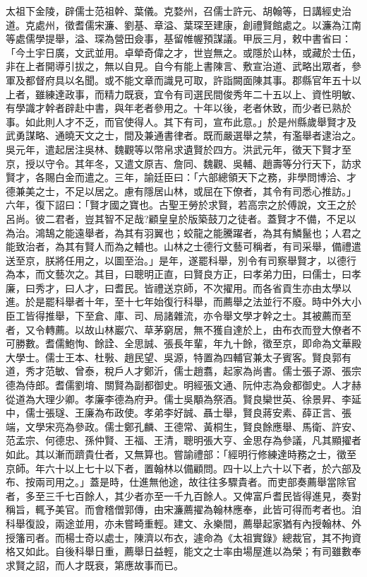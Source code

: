 太祖下金陵，辟儒士范祖幹、葉儀。克婺州，召儒士許元、胡翰等，日講經史治道。克處州，徵耆儒宋濂、劉基、章溢、葉琛至建康，創禮賢館處之。以濂為江南等處儒學提舉，溢、琛為營田僉事，基留帷幄預謀議。甲辰三月，敕中書省曰：「今土宇日廣，文武並用。卓犖奇偉之才，世豈無之。或隱於山林，或藏於士伍，非在上者開導引拔之，無以自見。自今有能上書陳言、敷宣治道、武略出眾者，參軍及都督府具以名聞。或不能文章而識見可取，許詣闕面陳其事。郡縣官年五十以上者，雖練達政事，而精力既衰，宜令有司選民間俊秀年二十五以上、資性明敏、有學識才幹者辟赴中書，與年老者參用之。十年以後，老者休致，而少者已熟於事。如此則人才不乏，而官使得人。其下有司，宣布此意。」於是州縣歲舉賢才及武勇謀略、通曉天文之士，間及兼通書律者。既而嚴選舉之禁，有濫舉者逮治之。吳元年，遣起居注吳林、魏觀等以幣帛求遺賢於四方。洪武元年，徵天下賢才至京，授以守令。其年冬，又遣文原吉、詹同、魏觀、吳輔、趙壽等分行天下，訪求賢才，各賜白金而遣之。三年，諭廷臣曰：「六部總領天下之務，非學問博洽、才德兼美之士，不足以居之。慮有隱居山林，或屈在下僚者，其令有司悉心推訪。」六年，復下詔曰：「賢才國之寶也。古聖王勞於求賢，若高宗之於傅說，文王之於呂尚。彼二君者，豈其智不足哉?顧皇皇於版築鼓刀之徒者。蓋賢才不備，不足以為治。鴻鵠之能遠舉者，為其有羽翼也；蛟龍之能騰躍者，為其有鱗鬣也；人君之能致治者，為其有賢人而為之輔也。山林之士德行文藝可稱者，有司采舉，備禮遣送至京，朕將任用之，以圖至治。」是年，遂罷科舉，別令有司察舉賢才，以德行為本，而文藝次之。其目，曰聰明正直，曰賢良方正，曰孝弟力田，曰儒士，曰孝廉，曰秀才，曰人才，曰耆民。皆禮送京師，不次擢用。而各省貢生亦由太學以進。於是罷科舉者十年，至十七年始復行科舉，而薦舉之法並行不廢。時中外大小臣工皆得推舉，下至倉、庫、司、局諸雜流，亦令舉文學才幹之士。其被薦而至者，又令轉薦。以故山林巖穴、草茅窮居，無不獲自達於上，由布衣而登大僚者不可勝數。耆儒鮑恂、餘詮、全思誠、張長年輩，年九十餘，徵至京，即命為文華殿大學士。儒士王本、杜斅、趙民望、吳源，特置為四輔官兼太子賓客。賢良郭有道，秀才范敏、曾泰，稅戶人才鄭沂，儒士趙翥，起家為尚書。儒士張子源、張宗德為侍郎。耆儒劉堉、關賢為副都御史。明經張文通、阮仲志為僉都御史。人才赫從道為大理少卿。孝廉李德為府尹。儒士吳顒為祭酒。賢良欒世英、徐景昇、李延中，儒士張璲、王廉為布政使。孝弟李好誠、聶士舉，賢良蔣安素、薛正言、張端，文學宋亮為參政。儒士鄭孔麟、王德常、黃桐生，賢良餘應舉、馬衛、許安、范孟宗、何德忠、孫仲賢、王福、王清，聰明張大亨、金思存為參議，凡其顯擢者如此。其以漸而躋貴仕者，又無算也。嘗諭禮部：「經明行修練達時務之士，徵至京師。年六十以上七十以下者，置翰林以備顧問。四十以上六十以下者，於六部及布、按兩司用之。」蓋是時，仕進無他途，故往往多驟貴者。而吏部奏薦舉當除官者，多至三千七百餘人，其少者亦至一千九百餘人。又俾富戶耆民皆得進見，奏對稱旨，輒予美官。而會稽僧郭傳，由宋濂薦擢為翰林應奉，此皆可得而考者也。洎科舉復設，兩途並用，亦未嘗畸重輕。建文、永樂間，薦舉起家猶有內授翰林、外授籓司者。而楊士奇以處士，陳濟以布衣，遽命為《太祖實錄》總裁官，其不拘資格又如此。自後科舉日重，薦舉日益輕，能文之士率由場屋進以為榮；有司雖數奉求賢之詔，而人才既衰，第應故事而已。

